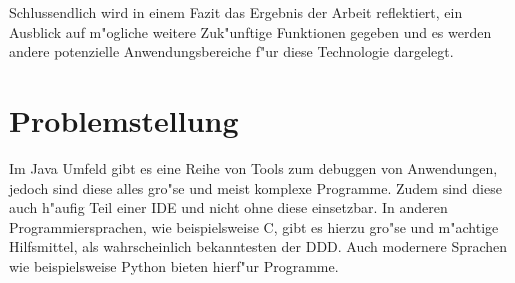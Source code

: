 Schlussendlich wird in einem Fazit das Ergebnis der Arbeit reflektiert, ein Ausblick auf m"ogliche weitere Zuk"unftige Funktionen gegeben und es werden andere potenzielle Anwendungsbereiche f"ur diese Technologie dargelegt.

\section{Problemstellung} 

Im Java Umfeld gibt es eine Reihe von Tools zum debuggen von Anwendungen, jedoch sind diese alles gro"se und meist komplexe Programme. Zudem sind diese auch h"aufig Teil einer \ac{IDE} und nicht ohne diese einsetzbar.
In anderen Programmiersprachen, wie beispielsweise C, gibt es hierzu gro"se und m"achtige Hilfsmittel, als wahrscheinlich bekanntesten der \ac{DDD}. Auch modernere Sprachen wie beispielsweise Python bieten hierf"ur Programme.
